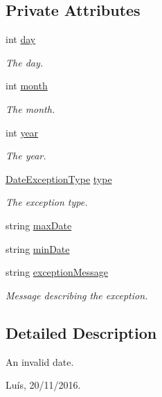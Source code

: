 \subsection*{Private Attributes}
\begin{DoxyCompactItemize}
\item 
int \hyperlink{class_invalid_date_ae88b81c9928d9f962229b4b60b1ca6e6}{day}
\begin{DoxyCompactList}\small\item\em The day. \end{DoxyCompactList}\item 
int \hyperlink{class_invalid_date_a63d1eb8cc29192ed24a608efaf8bb841}{month}
\begin{DoxyCompactList}\small\item\em The month. \end{DoxyCompactList}\item 
int \hyperlink{class_invalid_date_a796e1aee06941892afc67b4ebbbd84c3}{year}
\begin{DoxyCompactList}\small\item\em The year. \end{DoxyCompactList}\item 
\hyperlink{_exceptions_8hpp_a3c07f150c56e3659483593a47dafc0e3}{Date\+Exception\+Type} \hyperlink{class_invalid_date_a2ec333a89688d1f90713e647720ffda1}{type}
\begin{DoxyCompactList}\small\item\em The exception type. \end{DoxyCompactList}\item 
string \hyperlink{class_invalid_date_aa7a1be9dd6f1df990c62734800381c2a}{max\+Date}
\item 
string \hyperlink{class_invalid_date_ae3e99c48b2b32f9f88f1393f1d331ac8}{min\+Date}
\item 
string \hyperlink{class_invalid_date_add19d43b937e603b19cbf84a993cff91}{exception\+Message}
\begin{DoxyCompactList}\small\item\em Message describing the exception. \end{DoxyCompactList}\end{DoxyCompactItemize}


\subsection{Detailed Description}
An invalid date. 

Luís, 20/11/2016. 

